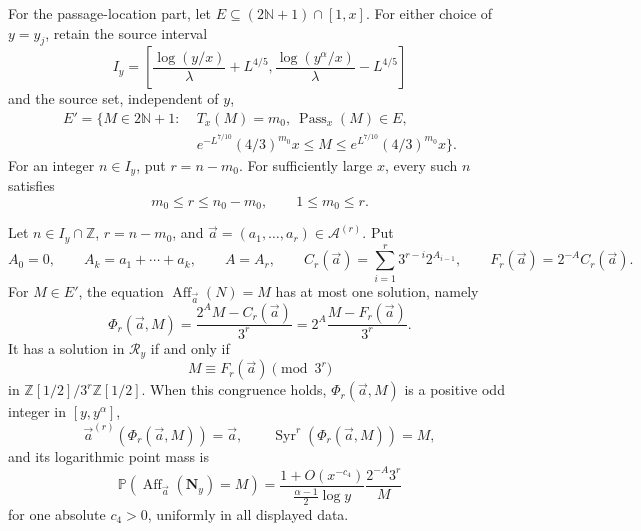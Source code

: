 For the passage-location part, let \(E\subseteq(2\mathbb N+1)\cap[1,x]\).
For either choice of \(y=y_j\), retain the source interval
\begin{equation}
\label{eq:Tao-Prop111-Iy}
 I_y=\left[
  \frac{\log(y/x)}\lambda+L^{4/5},
  \frac{\log(y^\alpha/x)}\lambda-L^{4/5}
 \right]
\end{equation}
and the source set, independent of \(y\),
\begin{equation}
\label{eq:Tao-Prop111-Eprime}
\begin{split}
 E'=\{M\in2\mathbb N+1:\;&T_x(M)=m_0,
 \ \operatorname{Pass}_x(M)\in E,\\
 &e^{-L^{7/10}}(4/3)^{m_0}x
 \le M\le
 e^{L^{7/10}}(4/3)^{m_0}x\}.
\end{split}
\end{equation}
For an integer \(n\in I_y\), put \(r=n-m_0\).  For sufficiently large
\(x\), every such \(n\) satisfies
\begin{equation}
\label{eq:Tao-Prop111-range}
 m_0\le r\le n_0-m_0,
 \qquad 1\le m_0\le r.
\end{equation}

\begin{proposition}
\label{prop:Tao-Prop111-affine-inverse}
Let \(n\in I_y\cap\mathbb Z\), \(r=n-m_0\), and
\(\vec a=(a_1,\ldots,a_r)\in\mathcal A^{(r)}\).  Put
\[
 A_0=0,
 \qquad A_k=a_1+\cdots+a_k,
 \qquad A=A_r,
 \qquad
 C_r(\vec a)=\sum_{i=1}^r3^{r-i}2^{A_{i-1}},
 \qquad F_r(\vec a)=2^{-A}C_r(\vec a).
\]
For \(M\in E'\), the equation
\(\operatorname{Aff}_{\vec a}(N)=M\) has at most one solution, namely
\begin{equation}
\label{eq:Tao-Prop111-Phi}
 \Phi_{r}(\vec a,M)
 =\frac{2^AM-C_r(\vec a)}{3^r}
 =2^A\frac{M-F_r(\vec a)}{3^r}.
\end{equation}
It has a solution in \(\mathcal R_y\) if and only if
\begin{equation}
\label{eq:Tao-Prop111-congruence}
 M\equiv F_r(\vec a)\pmod{3^r}
\end{equation}
in \(\mathbb Z[1/2]/3^r\mathbb Z[1/2]\).  When this congruence holds,
\(\Phi_r(\vec a,M)\) is a positive odd integer in \([y,y^\alpha]\),
\[
 \vec a^{(r)}(\Phi_r(\vec a,M))=\vec a,
 \qquad
 \operatorname{Syr}^r(\Phi_r(\vec a,M))=M,
\]
and its logarithmic point mass is
\begin{equation}
\label{eq:Tao-Prop111-point-mass}
 \mathbb P\!\left(
  \operatorname{Aff}_{\vec a}(\mathbf N_y)=M
 \right)
 =\frac{1+O(x^{-c_4})}{\frac{\alpha-1}{2}\log y}
  \frac{2^{-A}3^r}{M}
\end{equation}
for one absolute \(c_4>0\), uniformly in all displayed data.
\end{proposition}

